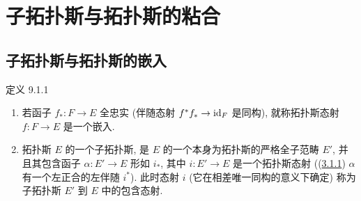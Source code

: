 \section{子拓扑斯与拓扑斯的粘合}\pageoriginale

\subsection{子拓扑斯与拓扑斯的嵌入}

\begin{enonce*}{定义 9.1.1}
\begin{enumerate}
\renewcommand{\theenumi}{\alph{enumi}}
\renewcommand{\labelenumi}{\theenumi)}
\item 若函子 $f_{\ast}:F\rightarrow E$ 全忠实
(\ie 伴随态射 $f^{\ast}f_{\ast}\rightarrow\operatorname{id}_F$ 是同构),
就称拓扑斯态射 $f:F\rightarrow E$ 是一个嵌入.

\item 拓扑斯 $E$ 的一个子拓扑斯,
是 $E$ 的一个本身为拓扑斯的严格全子范畴 $E'$,
并且其包含函子 $\alpha:E'\rightarrow E$ 形如 $i_{\ast}$,
其中 $i:E'\rightarrow E$ 是一个拓扑斯态射
(\ie (\hyperref[IV.subsubsec3.1.1]{3.1.1})
$\alpha$ 有一个左正合的左伴随 $i^{\ast}$).
此时态射 $i$ (它在相差唯一同构的意义下确定)
称为子拓扑斯 $E'$ 到 $E$ 中的包含态射.
\end{enumerate}
\end{enonce*}

